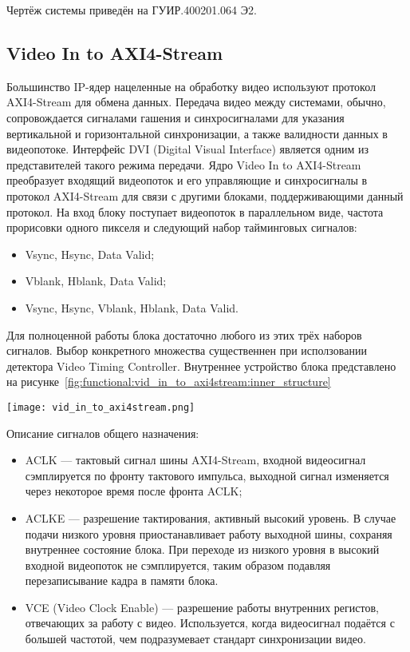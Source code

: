 Чертёж системы приведён на ГУИР.400201.064 Э2.

\subsection{Video In to AXI4-Stream}
\label{sec:functional:video_in_to_axi4stream}
Большинство IP-ядер нацеленные на обработку видео используют протокол AXI4-Stream для
обмена данных. Передача видео между системами, обычно, сопровождается сигналами гашения и
синхросигналами для указания вертикальной и горизонтальной синхронизации, а также
валидности данных в видеопотоке. Интерфейс DVI (Digital Visual Interface) является
одним из представителей такого режима передачи. Ядро Video In to AXI4-Stream преобразует
входящий видеопоток и его управляющие и синхросигналы в протокол AXI4-Stream для
связи с другими блоками, поддерживающими данный протокол. На вход блоку поступает
видеопоток в параллельном виде, частота прорисовки одного пикселя и следующий набор
тайминговых сигналов:

\begin{itemize}
  \item Vsync, Hsync, Data Valid;
  \item Vblank, Hblank, Data Valid;
  \item Vsync, Hsync, Vblank, Hblank, Data Valid.
\end{itemize}

Для полноценной работы блока достаточно любого из этих трёх наборов сигналов. Выбор конкретного
множества существеннен при исползовании детектора Video Timing Controller.
Внутреннее устройство блока представлено на рисунке~\ref{fig:functional:vid_in_to_axi4stream:inner_structure}

\begin{center}
  \centering
  \texttt{[image: vid\_in\_to\_axi4stream.png]}
  \label{fig:functional:vid_in_to_axi4stream:inner_structure}
\end{center}

Описание сигналов общего назначения:

\begin{itemize}
  \item ACLK --- тактовый сигнал шины AXI4-Stream, входной видеосигнал сэмплируется по фронту
    тактового импульса, выходной сигнал  изменяется через некоторое время после фронта ACLK;
  \item ACLKE --- разрешение тактирования, активный высокий уровень. В случае подачи низкого уровня
    приостанавливает работу выходной шины, сохраняя внутреннее состояние блока. При переходе
    из низкого уровня в высокий входной видеопоток не сэмплируется, таким образом подавляя перезаписывание
    кадра в памяти блока.
  \item VCE (Video Clock Enable) --- разрешение работы внутренних регистов, отвечающих за работу с видео.
    Используется, когда видеосигнал подаётся с большей частотой, чем подразумевает стандарт синхронизации видео.
\end{itemize}

